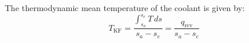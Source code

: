 The thermodynamic mean temperature of the coolant is given by:  
\[
T_{\text{KF}} = \frac{\int_{s_a}^{s_e} T \, ds}{s_a - s_e} = \frac{q_{\text{rev}}}{s_a - s_e}
\]